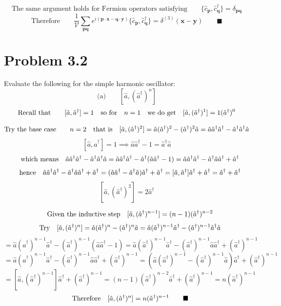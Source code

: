 \documentclass{amsart}
\begin{document}
\[\text{The same argument holds for Fermion operators satisfying}\qquad\{\hat{c}_{\boldsymbol{p}},\hat{c}^\dagger_{\boldsymbol{q}}\}  = \delta_{\boldsymbol{pq}}  \]
\[\text{Therefore}\qquad\frac{1}{\mathcal{V}}\sum_{\boldsymbol{pq}}e^{i(\boldsymbol{p\cdot x}-\boldsymbol{q\cdot y})}\{\hat{c}_{\boldsymbol{p}},\hat{c}^\dagger_{\boldsymbol{q}}\}=\delta^{(3)} (\boldsymbol{x}-\boldsymbol{y})\qquad\blacksquare\]

\section*{Problem 3.2}
Evaluate the following for the simple harmonic oscillator:
\[\text{(a)}\qquad[\hat{a},(\hat{a}^\dagger)^n]   \]
\[\text{Recall that}\qquad[\hat{a},\hat{a}^\dagger] = 1\qq{so for}n=1\qq{we do get}[\hat{a},(\hat{a}^\dagger)^1] =1(\hat{a}^\dagger)^0 \]

\[\text{Try the base case}\qquad n=2\qq{that is}[\hat{a},(\hat{a}^\dagger)^2] = \hat{a}(\hat{a}^\dagger)^2-(\hat{a}^\dagger)^2 \hat{a} = \hat{a}\hat{a}^\dagger \hat{a}^\dagger-\hat{a}^\dagger \hat{a}^\dagger \hat{a}   \]
\[[\hat{a},\hat{a}^\dagger] = 1 \implies \hat{a}\hat{a}^\dagger -1 =  \hat{a}^\dagger \hat{a}\]
\[\qq{which means}\hat{a}\hat{a}^\dagger \hat{a}^\dagger-\hat{a}^\dagger \hat{a}^\dagger \hat{a} =\hat{a}\hat{a}^\dagger \hat{a}^\dagger-\hat{a}^\dagger (\hat{a}\hat{a}^\dagger -1 ) =\hat{a}\hat{a}^\dagger \hat{a}^\dagger-\hat{a}^\dagger \hat{a}\hat{a}^\dagger +\hat{a}^\dagger\]
\[\qq{hence}\hat{a}\hat{a}^\dagger \hat{a}^\dagger-\hat{a}^\dagger \hat{a}\hat{a}^\dagger +\hat{a}^\dagger=(\hat{a}\hat{a}^\dagger -\hat{a}^\dagger \hat{a})\hat{a}^\dagger +\hat{a}^\dagger   =[\hat{a},\hat{a}^\dagger] \hat{a}^\dagger +\hat{a}^\dagger  = \hat{a}^\dagger +\hat{a}^\dagger \]
\[ [\hat{a},(\hat{a}^\dagger)^2]   =2\hat{a}^\dagger \]

\[\qq{Given the inductive step}[\hat{a},(\hat{a}^\dagger)^{n-1}] =(n-1)(\hat{a}^\dagger)^{n-2} \]
\[\qq{Try}[\hat{a},(\hat{a}^\dagger)^n]=\hat{a}(\hat{a}^\dagger)^n-(\hat{a}^\dagger)^n \hat{a}=\hat{a}(\hat{a}^\dagger)^{n-1}\hat{a}^\dagger-(\hat{a}^\dagger)^{n-1}\hat{a}^\dagger \hat{a}\]
\[=\hat{a}(\hat{a}^\dagger)^{n-1}\hat{a}^\dagger-(\hat{a}^\dagger)^{n-1}(\hat{a}\hat{a}^\dagger -1 )=\hat{a}(\hat{a}^\dagger)^{n-1}\hat{a}^\dagger-(\hat{a}^\dagger)^{n-1}\hat{a}\hat{a}^\dagger +(\hat{a}^\dagger)^{n-1}\]
\[=\hat{a}(\hat{a}^\dagger)^{n-1}\hat{a}^\dagger-(\hat{a}^\dagger)^{n-1}\hat{a}\hat{a}^\dagger +(\hat{a}^\dagger)^{n-1}=(\hat{a}(\hat{a}^\dagger)^{n-1}-(\hat{a}^\dagger)^{n-1}\hat{a})\hat{a}^\dagger +(\hat{a}^\dagger)^{n-1}\]
\[=[\hat{a},(\hat{a}^\dagger)^{n-1}]\hat{a}^\dagger +(\hat{a}^\dagger)^{n-1}=(n-1)(\hat{a}^\dagger)^{n-2}\hat{a}^\dagger+(\hat{a}^\dagger)^{n-1}=n(\hat{a}^\dagger)^{n-1}\]
\[\qq{Therefore}[\hat{a},(\hat{a}^\dagger)^n]=n(\hat{a}^\dagger)^{n-1}\qquad\blacksquare\]
\end{document}
